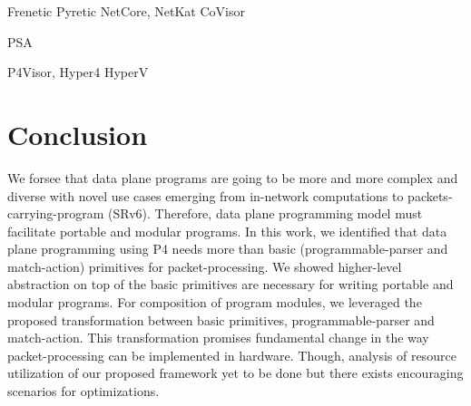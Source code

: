 \documentclass[letterpaper,twocolumn,10pt]{article}
\begin{document}
Frenetic Pyretic NetCore, NetKat CoVisor

PSA

P4Visor, Hyper4 HyperV

\section{Conclusion}
We forsee that data plane programs are going to be more and more complex and diverse with novel use cases emerging from in-network computations to packets-carrying-program (SRv6).
Therefore, data plane programming model must facilitate portable and modular programs.
In this work, we identified that data plane programming using P4 needs more than basic (programmable-parser and match-action) primitives for packet-processing.
We showed higher-level abstraction on top of the basic primitives are necessary for writing portable and modular programs.
For composition of program modules, we leveraged the proposed transformation between basic primitives, programmable-parser and match-action.
This transformation promises fundamental change in the way packet-processing can be implemented in hardware.
Though, analysis of resource utilization of our proposed framework yet to be done but there exists encouraging scenarios for optimizations.




\clearpage




\appendix
\end{document}
